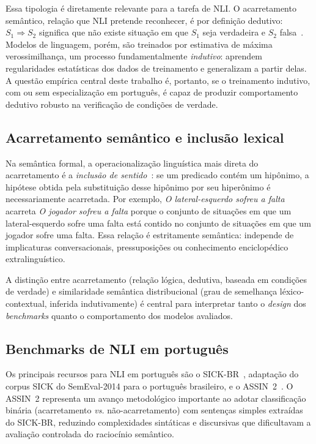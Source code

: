 \documentclass[12pt]{article}
\begin{document}
Essa tipologia é diretamente relevante para a tarefa de NLI. O acarretamento
semântico, relação que NLI pretende reconhecer, é por definição dedutivo:
$S_1 \Rightarrow S_2$ significa que não existe situação em que $S_1$ seja
verdadeira e $S_2$ falsa~\cite{Ferreira2019}. Modelos de linguagem, porém, são
treinados por estimativa de máxima verossimilhança, um processo
fundamentalmente \emph{indutivo}: aprendem regularidades estatísticas dos dados
de treinamento e generalizam a partir delas. A questão empírica central deste
trabalho é, portanto, se o treinamento indutivo, com ou sem especialização
em português, é capaz de produzir comportamento dedutivo robusto na
verificação de condições de verdade.

\subsection{Acarretamento semântico e inclusão lexical}

Na semântica formal, a operacionalização linguística mais direta do
acarretamento é a \emph{inclusão de sentido}~\cite{Ferreira2019}: se um
predicado contém um hipônimo, a hipótese obtida pela substituição desse
hipônimo por seu hiperônimo é necessariamente acarretada. Por exemplo,
\emph{O lateral-esquerdo sofreu a falta} acarreta \emph{O jogador sofreu a
falta} porque o conjunto de situações em que um lateral-esquerdo sofre uma
falta está contido no conjunto de situações em que um jogador sofre uma falta.
Essa relação é estritamente semântica: independe de implicaturas
conversacionais, pressuposições ou conhecimento enciclopédico extralinguístico.

A distinção entre acarretamento (relação lógica, dedutiva, baseada em
condições de verdade) e similaridade semântica distribucional (grau de
semelhança léxico-contextual, inferida indutivamente) é central para
interpretar tanto o \emph{design} dos \emph{benchmarks} quanto o comportamento
dos modelos avaliados.

\subsection{Benchmarks de NLI em português}

Os principais recursos para NLI em português são o SICK-BR~\cite{real18},
adaptação do corpus SICK do SemEval-2014 para o português brasileiro, e o
ASSIN~2~\cite{real2020assin}. O ASSIN~2 representa um avanço metodológico
importante ao adotar classificação binária (acarretamento \emph{vs.}
não-acarretamento) com sentenças simples extraídas do SICK-BR, reduzindo
complexidades sintáticas e discursivas que dificultavam a avaliação controlada
do raciocínio semântico.
\end{document}
